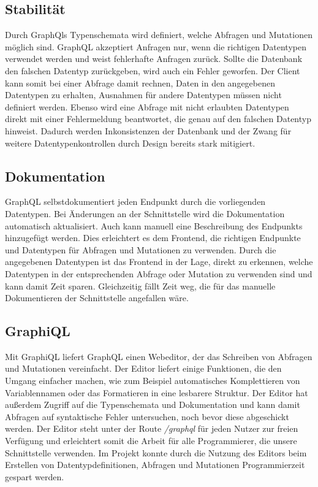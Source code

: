 \subsection{Stabilität}
Durch GraphQls Typenschemata wird definiert, welche Abfragen und Mutationen möglich sind.
GraphQL akzeptiert Anfragen nur, wenn die richtigen Datentypen verwendet werden und weist fehlerhafte Anfragen zurück.
Sollte die Datenbank den falschen Datentyp zurückgeben, wird auch ein Fehler geworfen.
Der Client kann somit bei einer Abfrage damit rechnen, Daten in den angegebenen Datentypen zu erhalten, Ausnahmen für andere Datentypen müssen nicht definiert werden.
Ebenso wird eine Abfrage mit nicht erlaubten Datentypen direkt mit einer Fehlermeldung beantwortet, die genau auf den falschen Datentyp hinweist.
Dadurch werden Inkonsistenzen der Datenbank und der Zwang für weitere Datentypenkontrollen durch Design bereits stark mitigiert.

\subsection{Dokumentation}
GraphQL selbstdokumentiert jeden Endpunkt durch die vorliegenden Datentypen.
Bei Änderungen an der Schnittstelle wird die Dokumentation automatisch aktualisiert. Auch kann manuell eine Beschreibung des Endpunkts hinzugefügt werden. Dies erleichtert es dem Frontend, die richtigen Endpunkte und Datentypen für Abfragen und Mutationen zu verwenden. Durch die angegebenen Datentypen ist das Frontend in der Lage, direkt zu erkennen, welche Datentypen in der entsprechenden Abfrage oder Mutation zu verwenden sind und kann damit Zeit sparen.
Gleichzeitig fällt Zeit weg, die für das manuelle Dokumentieren der Schnittstelle angefallen wäre.

\subsection{GraphiQL}
Mit GraphiQL liefert GraphQL einen Webeditor, der das Schreiben von Abfragen und Mutationen vereinfacht.
Der Editor liefert einige Funktionen, die den Umgang einfacher machen, wie zum Beispiel automatisches Komplettieren von Variablennamen oder das Formatieren in eine lesbarere Struktur.
Der Editor hat außerdem Zugriff auf die Typenschemata und Dokumentation und kann damit Abfragen auf syntaktische Fehler untersuchen, noch bevor diese abgeschickt werden.
Der Editor steht unter der Route \textit{/graphql} für jeden Nutzer zur freien Verfügung und erleichtert somit die Arbeit für alle Programmierer, die unsere Schnittstelle verwenden.
Im Projekt konnte durch die Nutzung des Editors beim Erstellen von Datentypdefinitionen, Abfragen und Mutationen Programmierzeit gespart werden.

